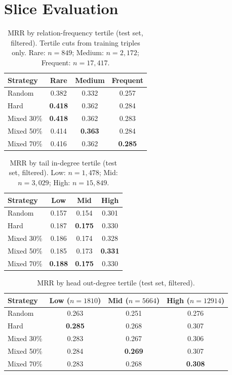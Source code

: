 \documentclass[10pt,twocolumn,letterpaper]{article}
\begin{document}
\section{Slice Evaluation}
\label{sec:slices}

\begin{table}[ht]
\centering\scriptsize
\caption{MRR by relation-frequency tertile (test set, filtered).
Tertile cuts from training triples only.
Rare: $n=849$; Medium: $n=2{,}172$; Frequent: $n=17{,}417$.}
\label{tab:slice-rel}
\begin{tabular}{@{}lccc@{}}
\toprule
Strategy & Rare & Medium & Frequent \\
\midrule
Random     & 0.382 & 0.332 & 0.257 \\
Hard       & \textbf{0.418} & 0.362 & 0.284 \\
Mixed 30\% & \textbf{0.418} & 0.362 & 0.283 \\
Mixed 50\% & 0.414 & \textbf{0.363} & 0.284 \\
Mixed 70\% & 0.416 & 0.362 & \textbf{0.285} \\
\bottomrule
\end{tabular}
\end{table}

\begin{table}[ht]
\centering\scriptsize
\caption{MRR by tail in-degree tertile (test set, filtered).
Low: $n=1{,}478$; Mid: $n=3{,}029$; High: $n=15{,}849$.}
\label{tab:slice-tail}
\begin{tabular}{@{}lccc@{}}
\toprule
Strategy & Low & Mid & High \\
\midrule
Random     & 0.157 & 0.154 & 0.301 \\
Hard       & 0.187 & \textbf{0.175} & 0.330 \\
Mixed 30\% & 0.186 & 0.174 & 0.328 \\
Mixed 50\% & 0.185 & 0.173 & \textbf{0.331} \\
Mixed 70\% & \textbf{0.188} & \textbf{0.175} & 0.330 \\
\bottomrule
\end{tabular}
\end{table}

\begin{table}[ht]
\centering\scriptsize
\caption{MRR by head out-degree tertile (test set, filtered).}
\label{tab:slice-head}
\begin{tabular}{@{}lccc@{}}
\toprule
Strategy & Low ($n=1810$) & Mid ($n=5664$) & High ($n=12914$) \\
\midrule
Random   & 0.263 & 0.251 & 0.276 \\
Hard     & \textbf{0.285} & 0.268 & 0.307 \\
Mixed 30\% & 0.283 & 0.267 & 0.306 \\
Mixed 50\% & 0.284 & \textbf{0.269} & 0.307 \\
Mixed 70\% & 0.283 & 0.268 & \textbf{0.308} \\
\bottomrule
\end{tabular}
\end{table}
\end{document}
